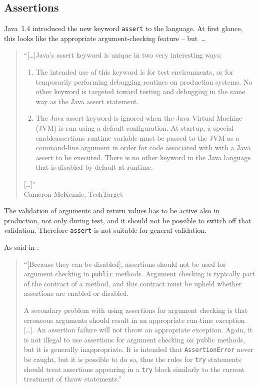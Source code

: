 
\subsection{Assertions}\label{sec:Assertions}
Java~1.4 introduced the new keyword \lstinline|assert|\autocite{ORACLE_DOC_LANGUAGE_SPECIFICATION:Assert} to the language. At first glance, this looks like the appropriate argument-checking feature – but~… 
\begin{quote}
“[…]Java's assert keyword is unique in two very interesting ways:

\begin{enumerate}
\item{The intended use of this keyword is for test environments, or for temporarily performing debugging routines on production systems. No other keyword is targeted toward testing and debugging in the same way as the Java assert statement.}
\item{The Java assert keyword is ignored when the Java Virtual Machine (JVM) is run using a default configuration. At startup, a special enableassertions runtime variable must be passed to the JVM as a command-line argument in order for code associated with with a Java assert to be executed. There is no other keyword in the Java language that is disabled by default at runtime.}
\end{enumerate}
[…]”\\ Cameron McKenzie, TechTarget\autocite{SERVERSIDE:JavaAssert}
\end{quote}

The validation of arguments and return values has to be active also in production, not only during test, and it should not be possible to switch off that validation. Therefore \lstinline|assert| is not suitable for general validation. 

As said in \jls\autocite{ORACLE_DOC_LANGUAGE_SPECIFICATION:Assert}:
\begin{quote}
“[Because they can be disabled], assertions should not be used for argument checking in \lstinline|public| methods. Argument checking is typically part of the contract of a method, and this contract must be upheld whether assertions are enabled or disabled.

A secondary problem with using assertions for argument checking is that erroneous arguments should result in an appropriate run-time exception […]. An assertion failure will not throw an appropriate exception. Again, it is not illegal to use assertions for argument checking on public methods, but it is generally inappropriate. It is intended that \lstinline|AssertionError| never be caught, but it is possible to do so, thus the rules for \lstinline|try| statements should treat assertions appearing in a \lstinline|try| block similarly to the current treatment of throw statements.”
\end{quote}

